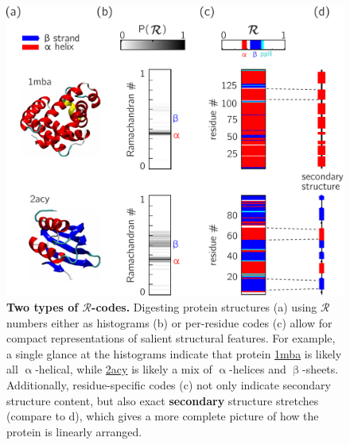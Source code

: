 \documentclass[fleqn,10pt,lineno]{wlpeerj} %
\newcommand{\n}[1]{{\textbf{\color{red}#1}}}
\begin{document}
\begin{figure}[t!]
\centering
\includegraphics[width=0.65\linewidth]{figures/fig2_metrics.pdf}
\caption{\textbf{Two types of $\mathcal{R}$-codes.} Digesting protein structures (a) using $\mathcal{R}$ numbers either as histograms (b) or per-residue codes (c) allow for compact representations of salient structural features. For example, a single glance at the histograms indicate that protein \href{https://www.rcsb.org/structure/1MBA}{1mba} is likely all $\upalpha$-helical, while \href{https://www.rcsb.org/structure/2ACY}{2acy} is likely a mix of $\upalpha$-helices and $\upbeta$-sheets. Additionally, residue-specific codes (c) not only indicate secondary structure content, but also exact \n{secondary} structure stretches (compare to d), which gives a more complete picture of how the protein is linearly arranged. \label{fig:simple_stacks}} 
\end{figure}

\end{document}
